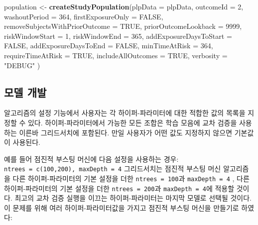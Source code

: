 \documentclass[10.5pt]{book}
\newenvironment{Shaded}{\begin{snugshade}}{\end{snugshade}}
\newcommand{\KeywordTok}[1]{\textcolor[rgb]{0.13,0.29,0.53}{\textbf{#1}}}
\newcommand{\DataTypeTok}[1]{\textcolor[rgb]{0.13,0.29,0.53}{#1}}
\newcommand{\DecValTok}[1]{\textcolor[rgb]{0.00,0.00,0.81}{#1}}
\newcommand{\StringTok}[1]{\textcolor[rgb]{0.31,0.60,0.02}{#1}}
\newcommand{\OtherTok}[1]{\textcolor[rgb]{0.56,0.35,0.01}{#1}}
\newcommand{\NormalTok}[1]{#1}
\theoremstyle{definition}
\theoremstyle{definition}
\theoremstyle{definition}
\theoremstyle{remark}
\begin{document}
\begin{Shaded}
\begin{Highlighting}[]
\NormalTok{population <-}\StringTok{ }\KeywordTok{createStudyPopulation}\NormalTok{(}\DataTypeTok{plpData =}\NormalTok{ plpData,}
                                    \DataTypeTok{outcomeId =} \DecValTok{2}\NormalTok{,}
                                    \DataTypeTok{washoutPeriod =} \DecValTok{364}\NormalTok{,}
                                    \DataTypeTok{firstExposureOnly =} \OtherTok{FALSE}\NormalTok{,}
                                    \DataTypeTok{removeSubjectsWithPriorOutcome =} \OtherTok{TRUE}\NormalTok{,}
                                    \DataTypeTok{priorOutcomeLookback =} \DecValTok{9999}\NormalTok{,}
                                    \DataTypeTok{riskWindowStart =} \DecValTok{1}\NormalTok{,}
                                    \DataTypeTok{riskWindowEnd =} \DecValTok{365}\NormalTok{,}
                                    \DataTypeTok{addExposureDaysToStart =} \OtherTok{FALSE}\NormalTok{,}
                                    \DataTypeTok{addExposureDaysToEnd =} \OtherTok{FALSE}\NormalTok{,}
                                    \DataTypeTok{minTimeAtRisk =} \DecValTok{364}\NormalTok{,}
                                    \DataTypeTok{requireTimeAtRisk =} \OtherTok{TRUE}\NormalTok{,}
                                    \DataTypeTok{includeAllOutcomes =} \OtherTok{TRUE}\NormalTok{,}
                                    \DataTypeTok{verbosity =} \StringTok{"DEBUG"}
\NormalTok{)}
\end{Highlighting}
\end{Shaded}

\subsection{모델 개발}\label{-}

알고리즘의 설정 기능에서 사용자는 각 하이퍼-파라미터에 대한 적합한 값의
목록을 지정할 수 있다. 하이퍼-파라미터에서 가능한 모든 조합은 학습
모음에 교차 검증을 사용하는 이른바 그리드서치에 포함된다. 만일 사용자가
어떤 값도 지정하지 않으면 기본값이 사용된다.

예를 들어 점진적 부스팅 머신에 다음 설정을 사용하는 경우:
\texttt{ntrees\ =\ c(100,200),\ maxDepth\ =\ 4} 그리드서치는 점진적
부스팅 머신 알고리즘을 다른 하이퍼-파라미터의 기본 설정을 더한
\texttt{ntrees\ =\ 100}과 \texttt{maxDepth\ =\ 4} , 다른
하이퍼-파라미터의 기본 설정을 더한 \texttt{ntrees\ =\ 200}과
\texttt{maxDepth\ =\ 4}에 적용할 것이다. 최고의 교차 검증 실행을 이끄는
하이퍼-파라미터는 마지막 모델로 선택될 것이다. 이 문제를 위해 여러
하이퍼-파라미터값을 가지고 점진적 부스팅 머신을 만들기로 하였다:
\end{document}
